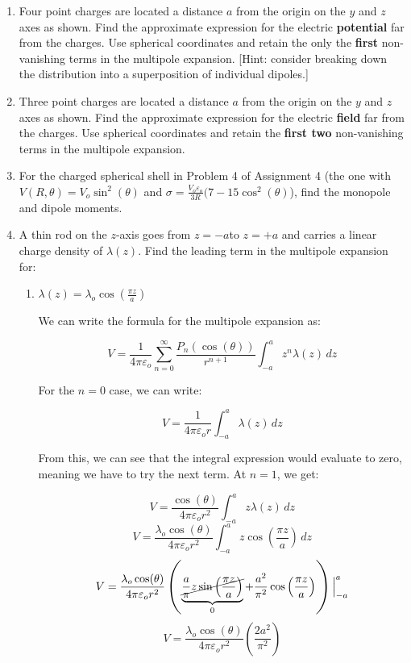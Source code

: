 \begin{enumerate}

  \item Four point charges are located a distance $a$ from the origin on the $y$ and $z$ axes as shown.  Find the approximate expression for the electric \textbf{potential} far from the charges.  Use spherical coordinates and retain the only the \textbf{first} non-vanishing terms in the multipole expansion. [Hint: consider breaking down the distribution into a superposition of individual dipoles.]

  \item Three point charges are located a distance $a$ from the origin on the $y$ and $z$ axes as shown.  Find the approximate expression for the electric \textbf{field} far from the charges.  Use spherical coordinates and retain the \textbf{first two} non-vanishing terms in the multipole expansion.

  \item For the charged spherical shell in Problem 4 of Assignment 4 (the one with $V(R,\theta)=V_o\sin^2(\theta)$ and $\sigma=\frac{V_o\varepsilon_o}{3R}(7-15\cos^2(\theta)$), find the monopole and dipole moments.

  \item A thin rod on the $z$-axis goes from $z=-a$to $z=+a$ and carries a linear charge density of $\lambda(z)$. Find the leading term in the multipole expansion for:

    \begin{enumerate}

      \item $\lambda(z)=\lambda_o\cos\left( \frac{\pi z}{a} \right)$

        We can write the formula for the multipole expansion as:

        $$V=\frac{1}{4\pi\varepsilon_o}\sum_{n=0}^\infty \frac{P_n(\cos(\theta))}{r^{n+1}}\int_{-a}^az^n\lambda(z)\,dz$$

        For the $n=0$ case, we can write:

        $$V=\frac{1}{4\pi\varepsilon_or}\int_{-a}^a \lambda(z)\,dz$$

        From this, we can see that the integral expression would evaluate to zero, meaning we have to try the next term. At $n=1$, we get:

        $$V=\frac{\cos(\theta)}{4\pi\varepsilon_or^2}\int_{-a}^a z\lambda(z)\,dz$$
        $$V=\frac{\lambda_o\cos(\theta)}{4\pi\varepsilon_or^2}\int_{-a}^a z\cos\left( \frac{\pi z}{a} \right)\,dz$$
        $$V=\frac{\lambda_o\cos(\theta)}{4\pi\varepsilon_or^2}\left(\underbrace{ \cancel{\frac{a}{\pi}z\sin\left( \frac{\pi z}{a} \right)}}_{0}+\frac{a^2}{\pi^2}\cos\left( \frac{\pi z}{a} \right) \right)\Big|_{-a}^a$$
        $$V=\frac{\lambda_o\cos(\theta)}{4\pi\varepsilon_or^2}\left(\frac{2a^2}{\pi^2}\right)$$


\end{enumerate}
\end{enumerate}
